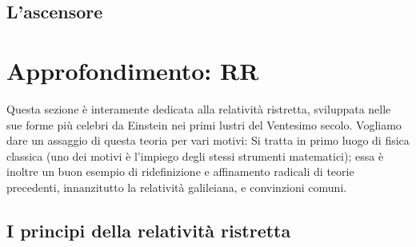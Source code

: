 \subsection{L'ascensore}

\section{Approfondimento: RR}
Questa sezione è interamente dedicata alla relatività ristretta, sviluppata
nelle sue forme più celebri da Einstein nei primi lustri del Ventesimo secolo.
Vogliamo dare un assaggio di questa teoria per vari motivi: Si tratta in primo
luogo di fisica classica (uno dei motivi è l'impiego degli stessi strumenti
matematici); essa è inoltre un buon esempio di ridefinizione e affinamento
radicali di teorie precedenti, innanzitutto la relatività galileiana, e convinzioni
comuni.

\subsection{I principi della relatività ristretta}